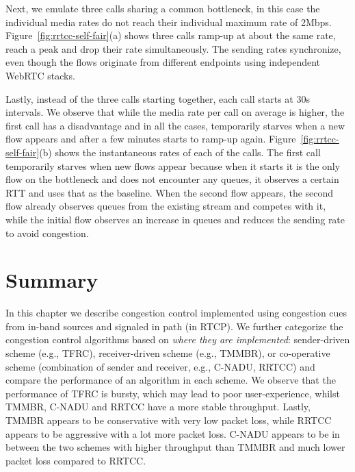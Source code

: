 \begin{table}[!t]
\begin{center}
\end{center}
    \caption{RRTCC competing with similar cross-traffic on the bottleneck link.}
    \label{tab:self-fair}
\end{table}

Next, we emulate three calls sharing a common bottleneck, in this case the
individual media rates do not reach their individual maximum rate of 2Mbps.
Figure~\ref{fig:rrtcc-self-fair}(a) shows three calls ramp-up at about the
same rate, reach a peak and drop their rate simultaneously. The sending rates
synchronize, even though the flows originate from different endpoints using
independent WebRTC stacks.

Lastly, instead of the three calls starting together, each call starts at 30s
intervals. We observe that while the media rate per call on average is higher,
the first call has a disadvantage and in all the cases, temporarily starves
when a new flow appears and after a few minutes starts to ramp-up again.
Figure~\ref{fig:rrtcc-self-fair}(b) shows the instantaneous rates of each of
the calls. The first call temporarily starves when new flows appear because
when it starts it is the only flow on the bottleneck and does not encounter
any queues, it observes a certain RTT and uses that as the baseline. When the
second flow appears, the second flow already observes queues from the existing
stream and competes with it, while the initial flow observes an increase in
queues and reduces the sending rate to avoid congestion.

\section{Summary}

In this chapter we describe congestion control implemented using congestion
cues from in-band sources and signaled in path (in RTCP). We further
categorize the congestion control algorithms based on \emph{where they are
implemented}: sender-driven scheme (e.g., TFRC), receiver-driven scheme (e.g.,
TMMBR), or co-operative scheme (combination of sender and receiver, e.g.,
C-NADU, RRTCC) and compare the performance of an algorithm in each scheme. We
observe that the performance of TFRC is bursty, which may lead to poor  
user-experience, whilst TMMBR, C-NADU and RRTCC have a more stable throughput.
Lastly, TMMBR appears to be conservative with very low packet loss, while
RRTCC appears to be aggressive with a lot more packet loss. C-NADU appears to
be in between the two schemes with higher throughput than TMMBR and much lower
packet loss compared to RRTCC.
